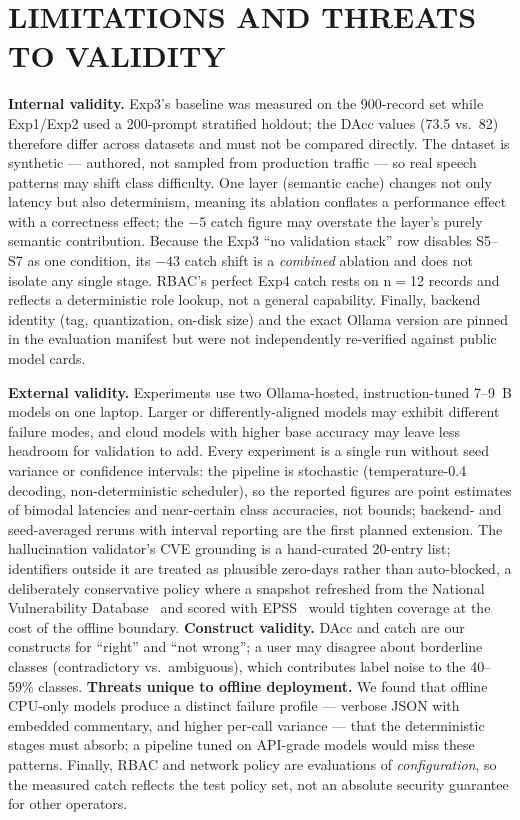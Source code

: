 \documentclass[conference]{IEEEtran}
\begin{document}
\section{LIMITATIONS AND THREATS TO VALIDITY}
\textbf{Internal validity.} Exp3's baseline was measured on the 900-record set while Exp1/Exp2 used a 200-prompt stratified holdout; the DAcc values (73.5 vs.\ 82) therefore differ across datasets and must not be compared directly. The dataset is synthetic --- authored, not sampled from production traffic --- so real speech patterns may shift class difficulty. One layer (semantic cache) changes not only latency but also determinism, meaning its ablation conflates a performance effect with a correctness effect; the $-5$ catch figure may overstate the layer's purely semantic contribution. Because the Exp3 ``no validation stack'' row disables S5--S7 as one condition, its ${-}43$ catch shift is a \emph{combined} ablation and does not isolate any single stage. RBAC's perfect Exp4 catch rests on n${=}$12 records and reflects a deterministic role lookup, not a general capability. Finally, backend identity (tag, quantization, on-disk size) and the exact Ollama version are pinned in the evaluation manifest but were not independently re-verified against public model cards.

\textbf{External validity.} Experiments use two Ollama-hosted, instruction-tuned 7--9~B models on one laptop. Larger or differently-aligned models may exhibit different failure modes, and cloud models with higher base accuracy may leave less headroom for validation to add. Every experiment is a single run without seed variance or confidence intervals: the pipeline is stochastic (temperature-0.4 decoding, non-deterministic scheduler), so the reported figures are point estimates of bimodal latencies and near-certain class accuracies, not bounds; backend- and seed-averaged reruns with interval reporting are the first planned extension. The hallucination validator's CVE grounding is a hand-curated 20-entry list; identifiers outside it are treated as plausible zero-days rather than auto-blocked, a deliberately conservative policy where a snapshot refreshed from the National Vulnerability Database~\cite{nistnvd} and scored with EPSS~\cite{firstepss} would tighten coverage at the cost of the offline boundary. \textbf{Construct validity.} DAcc and catch are our constructs for ``right'' and ``not wrong''; a user may disagree about borderline classes (contradictory vs.\ ambiguous), which contributes label noise to the 40--59\% classes. \textbf{Threats unique to offline deployment.} We found that offline CPU-only models produce a distinct failure profile --- verbose JSON with embedded commentary, and higher per-call variance --- that the deterministic stages must absorb; a pipeline tuned on API-grade models would miss these patterns. Finally, RBAC and network policy are evaluations of \emph{configuration}, so the measured catch reflects the test policy set, not an absolute security guarantee for other operators.
\end{document}
